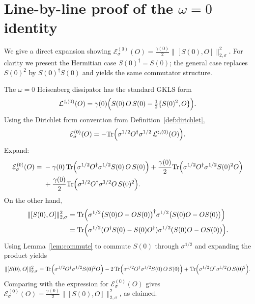 \documentclass[11pt]{article}
\theoremstyle{definition}
\theoremstyle{remark}
\begin{document}
\appendix

\section{Line-by-line proof of the $\omega = 0$ identity}
\label{app:proof}

We give a direct expansion showing $\mathcal{E}^{(0)}_\sigma(O) =
\frac{\gamma(0)}{2}\|[S(0),O]\|^2_{2,\sigma}$. For clarity we present the
Hermitian case $S(0)^\dagger = S(0)$; the general case replaces $S(0)^2$
by $S(0)^\dagger S(0)$ and yields the same commutator structure.

The $\omega = 0$ Heisenberg dissipator has the standard GKLS form
\[
\mathcal{L}^{\sharp,(0)}(O) = \gamma(0)\Bigl(S(0)\,O\,S(0) -
\tfrac12\{S(0)^2, O\}\Bigr).
\]
Using the Dirichlet form convention from
Definition~\ref{def:dirichlet},
\[
\mathcal{E}^{(0)}_\sigma(O) = -\mathrm{Tr}\Bigl(\sigma^{1/2}O^\dagger
\sigma^{1/2}\,\mathcal{L}^{\sharp,(0)}(O)\Bigr).
\]
Expand:
\begin{align*}
\mathcal{E}^{(0)}_\sigma(O) ={}& -\gamma(0)\,\mathrm{Tr}\Bigl(
\sigma^{1/2}O^\dagger\sigma^{1/2} S(0)\,O\,S(0)\Bigr)
+ \frac{\gamma(0)}{2}\mathrm{Tr}\Bigl(\sigma^{1/2}O^\dagger\sigma^{1/2}
S(0)^2 O\Bigr) \\
&+ \frac{\gamma(0)}{2}\mathrm{Tr}\Bigl(\sigma^{1/2}O^\dagger\sigma^{1/2}
O\,S(0)^2\Bigr).
\end{align*}
On the other hand,
\begin{align*}
\|[S(0),O]\|^2_{2,\sigma}
&= \mathrm{Tr}\Bigl(\sigma^{1/2}\bigl(S(0)O - OS(0)\bigr)^\dagger
\sigma^{1/2}\bigl(S(0)O - OS(0)\bigr)\Bigr) \\
&= \mathrm{Tr}\Bigl(\sigma^{1/2}(O^\dagger S(0) - S(0)O^\dagger)
\sigma^{1/2}(S(0)O - OS(0))\Bigr).
\end{align*}
Using Lemma~\ref{lem:commute} to commute $S(0)$ through $\sigma^{1/2}$
and expanding the product yields
\[
\|[S(0),O]\|^2_{2,\sigma} = \mathrm{Tr}\Bigl(\sigma^{1/2}O^\dagger
\sigma^{1/2}S(0)^2 O\Bigr) - 2\,\mathrm{Tr}\Bigl(\sigma^{1/2}O^\dagger
\sigma^{1/2}S(0)\,O\,S(0)\Bigr) + \mathrm{Tr}\Bigl(\sigma^{1/2}O^\dagger
\sigma^{1/2}O\,S(0)^2\Bigr).
\]
Comparing with the expression for $\mathcal{E}^{(0)}_\sigma(O)$ gives
$\mathcal{E}^{(0)}_\sigma(O) = \frac{\gamma(0)}{2}
\|[S(0),O]\|^2_{2,\sigma}$, as claimed.
\end{document}
